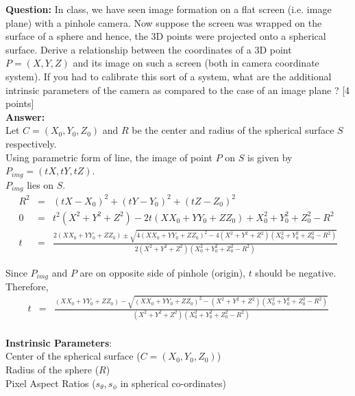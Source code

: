 \documentclass[11pt]{article}
\begin{document}
\maketitle

\textbf{Question:} In class, we have seen image formation on a flat screen (i.e. image plane) with a pinhole camera. Now suppose the screen was wrapped on the surface of a sphere and hence, the 3D points were projected onto a spherical surface. Derive a relationship between the coordinates of a 3D point $P = (X,Y,Z)$ and its image on such a screen (both in camera coordinate system). If you had to calibrate this sort of a system, what are the additional intrinsic parameters of the camera as compared to the case of an image plane ? \textsf{[4 points]} \\

\textbf{Answer:} \\

Let $C = (X_0, Y_0, Z_0)$ and $R$ be the center and radius of the spherical surface $S$ respectively. \\

Using parametric form of line, the image of point $P$ on $S$ is given by $P_{img} = (tX, tY, tZ)$. \\

$P_{img}$ lies on $S$. \\
\begin{eqnarray*}
R^2 &=& (tX - X_0)^2 + (tY - Y_0)^2 + (tZ - Z_0)^2 \\
0 &=& t^2(X^2 + Y^2 + Z^2) - 2t(XX_0 + YY_0 + ZZ_0) + X_0^2 + Y_0^2 + Z_0^2 - R^2\\
t &=& \frac{2(XX_0 + YY_0 + ZZ_0) \pm \sqrt{4(XX_0 + YY_0 + ZZ_0)^2 - 4(X^2 + Y^2 + Z^2)(X_0^2 + Y_0^2 + Z_0^2 - R^2)}}{2(X^2 + Y^2 + Z^2)(X_0^2 + Y_0^2 + Z_0^2 - R^2)}
\end{eqnarray*}

Since $P_{img}$ and $P$ are on opposite side of pinhole (origin), $t$ should be negative.\\

Therefore,\\
\begin{eqnarray*}
t &=& \frac{(XX_0 + YY_0 + ZZ_0) - \sqrt{(XX_0 + YY_0 + ZZ_0)^2 - (X^2 + Y^2 + Z^2)(X_0^2 + Y_0^2 + Z_0^2 - R^2)}}{(X^2 + Y^2 + Z^2)(X_0^2 + Y_0^2 + Z_0^2 - R^2)} \\
\end{eqnarray*}

\textbf{Instrinsic Parameters}: \\

Center of the spherical surface ($C = (X_0, Y_0, Z_0)$) \\

Radius of the sphere ($R$) \\

Pixel Aspect Ratios ($s_{\theta}, s_{\phi}$ in spherical co-ordinates) \\
\end{document}
